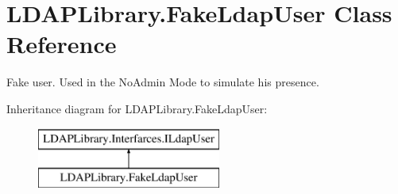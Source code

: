 \hypertarget{class_l_d_a_p_library_1_1_fake_ldap_user}{}\section{L\+D\+A\+P\+Library.\+Fake\+Ldap\+User Class Reference}
\label{class_l_d_a_p_library_1_1_fake_ldap_user}


Fake user. Used in the No\+Admin Mode to simulate his presence.  


Inheritance diagram for L\+D\+A\+P\+Library.\+Fake\+Ldap\+User\+:\begin{figure}[H]
\begin{center}
\leavevmode
\includegraphics[height=2.000000cm]{class_l_d_a_p_library_1_1_fake_ldap_user}
\end{center}
\end{figure}
